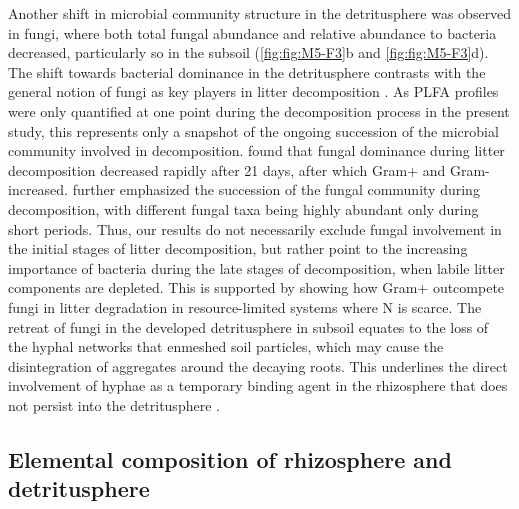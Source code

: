 Another shift in microbial community structure in the detritusphere was observed in fungi, where both total fungal abundance and relative abundance to bacteria decreased, particularly so in the subsoil (\ref{fig:fig:M5-F3}b and \ref{fig:fig:M5-F3}d). The shift towards bacterial dominance in the detritusphere contrasts with the general notion of fungi as key players in litter decomposition \citep{Williams2006, Voriskova2013}. As PLFA profiles were only quantified at one point during the decomposition process in the present study, this represents only a snapshot of the ongoing succession of the microbial community involved in decomposition. \citet{Herman2012} found that fungal dominance during litter decomposition decreased rapidly after 21 days, after which Gram+ and Gram- increased. \citet{Voriskova2013} further emphasized the succession of the fungal community during decomposition, with different fungal taxa being highly abundant only during short periods. Thus, our results do not necessarily exclude fungal involvement in the initial stages of litter decomposition, but rather point to the increasing importance of bacteria during the late stages of decomposition, when labile litter components are depleted. This is supported by \citet{Esperschuetz2011} showing how Gram+ outcompete fungi in litter degradation in resource-limited systems where N is scarce. The retreat of fungi in the developed detritusphere in subsoil equates to the loss of the hyphal networks that enmeshed soil particles, which may cause the disintegration of aggregates around the decaying roots. This underlines the direct involvement of hyphae as a temporary binding agent in the rhizosphere that does not persist into the detritusphere \citep{Six2004}.

\subsection{Elemental composition of rhizosphere and detritusphere}

